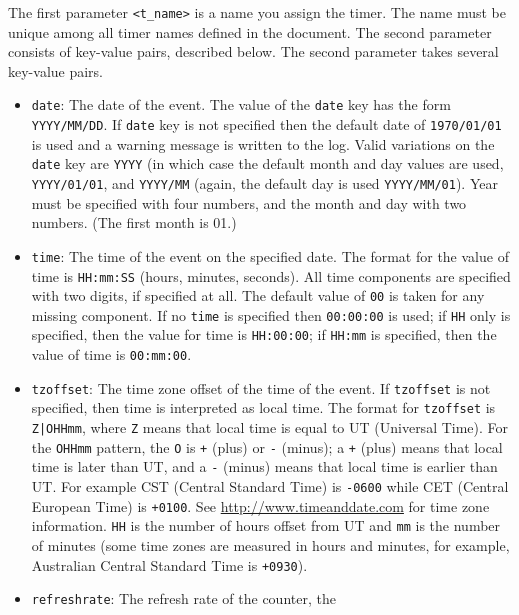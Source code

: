 \documentclass{article}
\begin{document}
\PD The first parameter \texttt{<t\_name>} is a name you assign the timer. The
name must be unique among all timer names defined in the document. The
second parameter consists of key-value pairs, described below.
\KVP The second parameter takes several key-value pairs.
\begin{itemize}
    \item \texttt{date}: The date of the event. The value of the \texttt{date} key
    has the form \texttt{YYYY/MM/DD}. If \texttt{date} key is not specified then
    the default date of \texttt{1970/01/01} is used and a warning message is
    written to the log. Valid variations on the \texttt{date} key are
    \texttt{YYYY} (in which case the default month and day values are
    used,  \texttt{YYYY/01/01}, and \texttt{YYYY/MM} (again, the
    default day is used \texttt{YYYY/MM/01}). Year must be specified with
    four numbers, and the month and day with two numbers. (The first month
    is 01.)
    \item \texttt{time}: The time of the event on the specified date. The
    format for the value of time is \texttt{HH:mm:SS} (hours, minutes,
    seconds). All time components are specified with two digits, if
    specified at all. The default value of \texttt{00} is taken for any
    missing component. If no \texttt{time} is specified then
    \texttt{00:00:00} is used; if \texttt{HH} only is specified, then the
    value for time is \texttt{HH:00:00}; if \texttt{HH:mm} is specified,
    then the value of time is \texttt{00:mm:00}.
    \item \texttt{tzoffset}: The time zone offset of the time of the
    event. If \texttt{tzoffset} is not specified, then time is interpreted
    as local time.  The format for \texttt{tzoffset} is \texttt{Z|OHHmm},
    where \texttt{Z} means that local time is equal to UT (Universal
    Time). For the \texttt{OHHmm} pattern, the \texttt{O} is \texttt{+} (plus) or
    \texttt{-} (minus); a \texttt{+} (plus) means that local time is later than
    UT, and a \texttt{-} (minus) means that local time is earlier than UT. For
    example CST (Central Standard Time) is \texttt{-0600} while CET (Central European Time) is
    \texttt{+0100}. See \url{http://www.timeanddate.com} for time zone
    information. \texttt{HH} is the number of hours offset from UT and \texttt{mm} is the
    number of minutes (some time zones are measured in hours and minutes,
    for example, Australian Central Standard Time is \texttt{+0930}).
    \item \texttt{refreshrate}: The refresh rate of the counter, the

\end{itemize}
\end{document}
